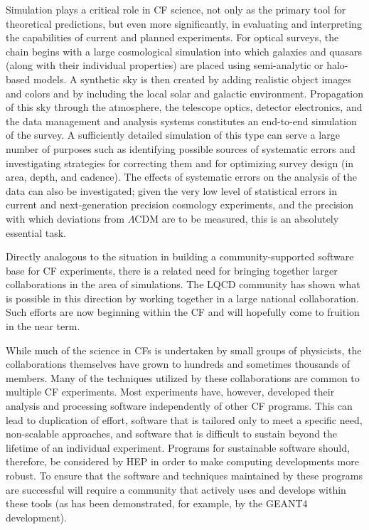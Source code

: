 Simulation plays a critical role in
CF science, not only as the primary tool for theoretical
predictions, but even more significantly, in evaluating and
interpreting the capabilities of current and planned experiments. For
optical surveys, the chain begins with a large cosmological simulation
into which galaxies and quasars (along with their individual
properties) are placed using semi-analytic or halo-based models. A
synthetic sky is then created by adding realistic object images and
colors and by including the local solar and galactic
environment. Propagation of this sky through the atmosphere, the
telescope optics, detector electronics, and the data management and
analysis systems constitutes an end-to-end simulation of the survey. A
sufficiently detailed simulation of this type can serve a large number
of purposes such as identifying possible sources of systematic errors
and investigating strategies for correcting them and for optimizing
survey design (in area, depth, and cadence). The effects of systematic
errors on the analysis of the data can also be investigated; given the
very low level of statistical errors in current and next-generation
precision cosmology experiments, and the precision with which
deviations from $\Lambda$CDM are to be measured, this is an absolutely
essential task.

Directly analogous to the situation in building a community-supported
software base for CF experiments, there is a related need
for bringing together larger collaborations in the area of
simulations. The LQCD community has shown what is possible in this
direction by working together in a large national collaboration. Such
efforts are now beginning within the CF and will
hopefully come to fruition in the near term.


While much of the science in CFs is undertaken by small
groups of physicists, the collaborations themselves have grown to
hundreds and sometimes thousands of members. Many of the techniques
utilized by these collaborations are common to multiple CF 
experiments. Most experiments have, however, developed their
analysis and processing software independently of other CF 
programs. This can lead to duplication of effort, software
that is tailored only to meet a specific need, non-scalable
approaches, and software that is difficult to sustain beyond the
lifetime of an individual experiment. Programs for sustainable
software should, therefore, be considered by HEP in order to make
computing developments more robust. To ensure that the software and
techniques maintained by these programs are successful will require a
community that actively uses and develops within these tools (as has
been demonstrated, for example, by the GEANT4 development). 


